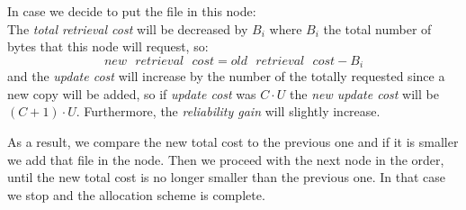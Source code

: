 In case we decide to put the file in this node: \\
The \textit{total retrieval cost} will be decreased by $B_i$ where $B_i$ the total number of bytes that this node will request, so: $$new\text{ }retrieval\text{ }cost = old\text{ }retrieval\text{ }cost - B_i$$ and the \textit{update cost} will increase by the number of the totally requested since a new copy will be added, so if \textit{update cost} was $C \cdot U$ the \textit{new update cost} will be $(C+1) \cdot U$. Furthermore, the \textit{reliability gain} will slightly increase.

As a result, we compare the new total cost to the previous one and if it is smaller we add that file in the node. Then we proceed with the next node in the order, until the new total cost is no longer smaller than the previous one. In that case we stop and the allocation scheme is complete.